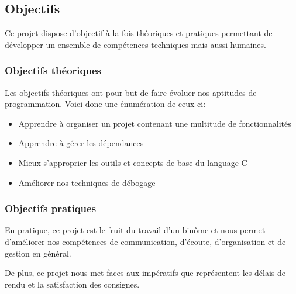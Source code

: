 \documentclass{article}
\begin{document}

    \subsection{Objectifs}
    \hspace{1em} Ce projet dispose d'objectif à la fois théoriques et pratiques permettant de développer un ensemble de compétences techniques mais aussi humaines.
    
        \subsubsection{Objectifs théoriques}
        \hspace{1em} Les objectifs théoriques ont pour but de faire évoluer nos aptitudes de programmation. Voici donc une énumération de ceux ci:

        \begin{itemize}
            
            \item Apprendre à organiser un projet contenant une multitude de fonctionnalités
            \item Apprendre à gérer les dépendances
            \item Mieux s'approprier les outils et concepts de base du language C
            \item Améliorer nos techniques de débogage
        \end{itemize}
    
        \subsubsection{Objectifs pratiques} 
        \hspace{1em} En pratique, ce projet est le fruit du travail d'un binôme et nous permet d'améliorer nos compétences de communication, d'écoute, d'organisation et de gestion en général.
        
        \vspace{1em} De plus, ce projet nous met faces aux impératifs que représentent les délais de rendu et la satisfaction des consignes.

   
\end{document}
